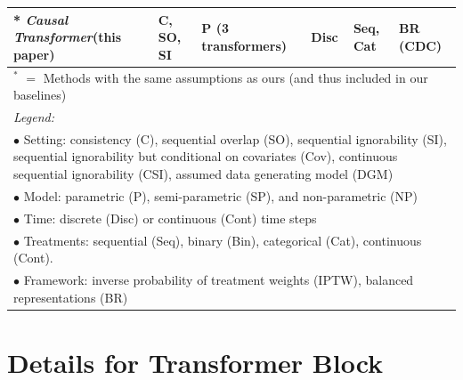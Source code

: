 \documentclass{article}
\theoremstyle{plain}
\theoremstyle{definition}
\theoremstyle{remark}
\newcommand{\longname}{\emph{Causal Transformer}\xspace}
\begin{document}
\begin{table}[h!]
\begin{center}
\begin{tabular}{l lllll}
                    \midrule
                    * \longname (this paper)              & C, SO, SI & P (3 transformers) & Disc & Seq, Cat & BR (CDC) \\
                    \bottomrule
                    \multicolumn{6}{l}{$^\ast$ $=$ Methods with the same assumptions as ours (and thus included in our baselines)} \\
                    \multicolumn{6}{p{14cm}}{\emph{Legend:}}\\
                    \multicolumn{6}{p{14cm}}{\quad $\bullet$ Setting: consistency (C), sequential overlap (SO), sequential ignorability (SI), sequential ignorability but conditional on covariates (Cov), continuous sequential ignorability (CSI), assumed data generating model (DGM)}\\
                    \multicolumn{6}{p{14cm}}{\quad $\bullet$ Model: parametric (P), semi-parametric (SP), and non-parametric (NP)}\\
                    \multicolumn{6}{p{14cm}}{\quad $\bullet$ Time: discrete (Disc) or continuous (Cont) time steps}\\
                    \multicolumn{6}{p{14cm}}{\quad $\bullet$ Treatments: sequential (Seq), binary (Bin), categorical (Cat), continuous (Cont).}\\
                    \multicolumn{6}{p{14cm}}{\quad $\bullet$ Framework: inverse probability of treatment weights (IPTW), balanced representations (BR)}
                \end{tabular}
    \end{center}
\end{table}

\clearpage
\section{Details for Transformer Block} \label{app:CT-block}
\end{document}
